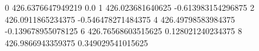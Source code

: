 0 426.6376647949219 0.0
1 426.023681640625 -0.613983154296875
2 426.0911865234375 -0.546478271484375
4 426.49798583984375 -0.139678955078125
6 426.76568603515625 0.128021240234375
8 426.9866943359375 0.349029541015625

